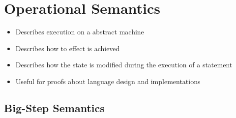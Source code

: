 
\section{Operational Semantics}
\begin{itemize}
    \item Describes execution on a abstract machine
    \item Describes how to effect is achieved
    \item Describes how the state is modified during the execution of a statement
    \item Useful for proofs about language design and implementations
\end{itemize}

\subsection{Big-Step Semantics}
